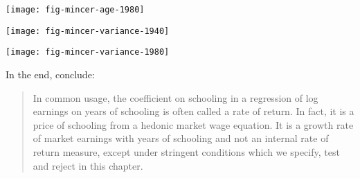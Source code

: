 \begin{frame}[plain]
\begin{center}
\texttt{[image: fig-mincer-age-1980]}
\end{center}
\end{frame}
\begin{frame}[plain]
\begin{center}
\texttt{[image: fig-mincer-variance-1940]}
\end{center}
\end{frame}
\begin{frame}[plain]
\begin{center}
\texttt{[image: fig-mincer-variance-1980]}
\end{center}
\end{frame}
\begin{frame}
In the end, \cite{Heckman.2006a} conclude:\vspace{0.5cm}

\begin{quote}
In common usage, the coefficient on schooling in a regression of log earnings on years of schooling is often called a rate of return. In fact, it is a price of schooling from a hedonic market wage equation. It is a growth rate of market earnings with years of schooling and not an internal rate of return measure, except under stringent conditions which we specify, test and reject in this chapter.
\end{quote}
\end{frame}
